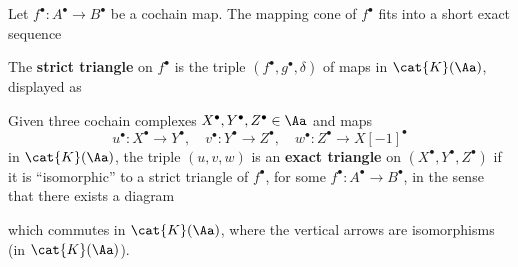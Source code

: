 \begin{df}
    Let $f^{\bullet} : A^{\bullet} \to B^{\bullet}$ be a cochain map.
    The mapping cone of $f^{\bullet}$ fits into a
    short exact sequence
    \begin{center}
    \end{center}
    The \textbf{strict triangle} on $f^{\bullet}$
    is the triple $(f^{\bullet}, g^{\bullet}, \delta)$
    of maps in $\cat{K}(\Aa)$, displayed as
    \begin{center}
    \end{center}
    
    Given three cochain complexes $X^{\bullet}, Y^{\bullet}, Z^{\bullet}
    \in \Aa$ and maps $$u^{\bullet} : X^{\bullet} \to Y^{\bullet}, \quad
    v^{\bullet} : Y^{\bullet} \to Z^{\bullet}, \quad
    w^{\bullet} : Z^{\bullet} \to X[-1]^{\bullet}$$ 
    in $\cat{K}(\Aa)$,
    the triple $(u,v,w)$ is an \textbf{exact triangle} 
    on $(X^{\bullet},Y^{\bullet},Z^{\bullet})$
    if it is ``isomorphic'' to a strict triangle of $f^{\bullet}$, 
    for some $f^{\bullet} : A^{\bullet} \to B^{\bullet}$, 
    in the sense that there exists a diagram
    \begin{center}
    \end{center}
    which commutes in $\cat{K}(\Aa)$, where the vertical arrows
    are isomorphisms (in $\cat{K}(\Aa)$).
\end{df}

